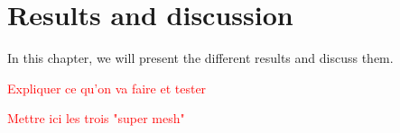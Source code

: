 \chapter{Results and discussion}
In this chapter, we will present the different results and discuss them.

\textcolor{red}{Expliquer ce qu'on va faire et tester}

\textcolor{red}{Mettre ici les trois "super mesh"}